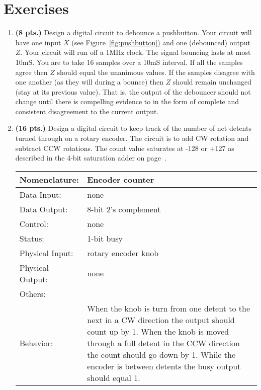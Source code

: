 \section{Exercises}
\label{section:commonperipheralComponents}
\graphicspath{ {./chapter10/FigHw} }

\begin{enumerate}

\item \textbf{ (8 pts.)}
Design a digital circuit to debounce a pushbutton.  Your circuit
will have one input $X$ (see Figure~\ref{fig:pushbutton}) and
one (debounced) output $Z$. Your circuit will run off a 1MHz clock.  
The signal bouncing lasts at most 10mS.  You are to take 16 samples 
over a 10mS interval.  If all the samples agree then $Z$ should
equal the unanimous values.  If the samples disagree with one
another (as they will during a bounce) then $Z$ should remain
unchanged (stay at its previous value).  That is, the output of 
the debouncer should not change until there is compelling evidence to
in the form of complete and consistent disagreement to the current
output.

\item\textbf{ (16 pts.)} Design a digital circuit to keep track of the
number of net detents turned through on a rotary encoder.  The circuit
is to add CW rotation and subtract CCW rotations.  The count value
saturates at -128 or +127 as described in the 4-bit saturation
adder on page~\pageref{page:saturation}.

\begin{tabular}{|l|p{3.5in}|} \hline
Nomenclature:  & Encoder counter         \\ \hline
Data Input:    & none         \\ \hline
Data Output:   & 8-bit 2's complement   \\ \hline
Control:       & none           \\ \hline
Status:        & 1-bit busy                                   \\ \hline
Physical Input:& rotary encoder knob        \\ \hline
Physical Output:& none          \\ \hline
Others:        &            \\ \hline
Behavior:      & When the knob is turn from one detent to the next in
a CW direction the output should count up by 1.  When the knob is moved
through a full detent in the CCW direction the count should go down
by 1.  While the encoder is between detents the busy output
should equal 1. \\ \hline
\end{tabular}


\end{enumerate}
